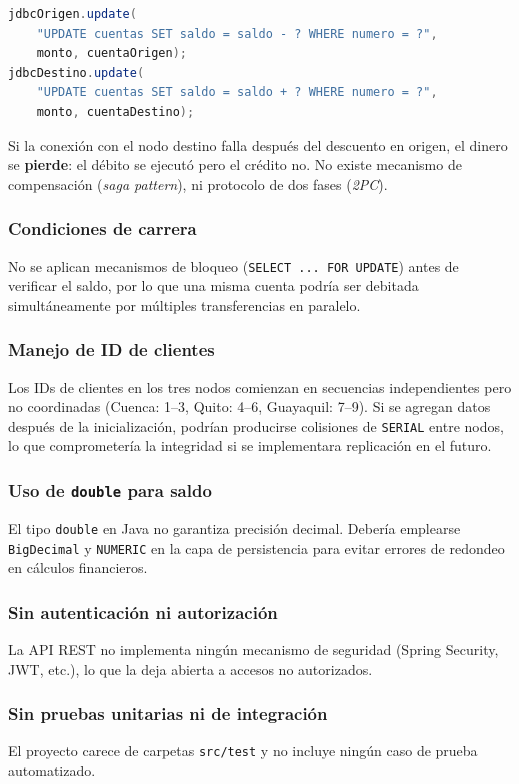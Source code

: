 \documentclass[12pt, a4paper]{article}
\begin{document}
\begin{lstlisting}[language=Java, caption={Operaciones sin transacción distribuida}]
jdbcOrigen.update(
    "UPDATE cuentas SET saldo = saldo - ? WHERE numero = ?",
    monto, cuentaOrigen);
jdbcDestino.update(
    "UPDATE cuentas SET saldo = saldo + ? WHERE numero = ?",
    monto, cuentaDestino);
\end{lstlisting}

Si la conexión con el nodo destino falla después del descuento en origen, el dinero se \textbf{pierde}: el débito se ejecutó pero el crédito no. No existe mecanismo de compensación (\textit{saga pattern}), ni protocolo de dos fases (\textit{2PC}).

\subsubsection{Condiciones de carrera}
No se aplican mecanismos de bloqueo (\texttt{SELECT ... FOR UPDATE}) antes de verificar el saldo, por lo que una misma cuenta podría ser debitada simultáneamente por múltiples transferencias en paralelo.

\subsubsection{Manejo de ID de clientes}
Los IDs de clientes en los tres nodos comienzan en secuencias independientes pero no coordinadas (Cuenca: 1--3, Quito: 4--6, Guayaquil: 7--9). Si se agregan datos después de la inicialización, podrían producirse colisiones de \texttt{SERIAL} entre nodos, lo que comprometería la integridad si se implementara replicación en el futuro.

\subsubsection{Uso de \texttt{double} para saldo}
El tipo \texttt{double} en Java no garantiza precisión decimal. Debería emplearse \texttt{BigDecimal} y \texttt{NUMERIC} en la capa de persistencia para evitar errores de redondeo en cálculos financieros.

\subsubsection{Sin autenticación ni autorización}
La API REST no implementa ningún mecanismo de seguridad (Spring Security, JWT, etc.), lo que la deja abierta a accesos no autorizados.

\subsubsection{Sin pruebas unitarias ni de integración}
El proyecto carece de carpetas \texttt{src/test} y no incluye ningún caso de prueba automatizado.
\end{document}
